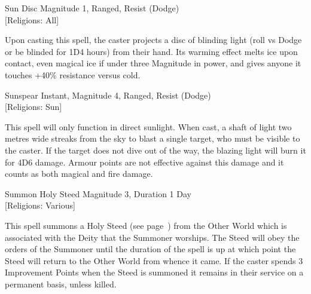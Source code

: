\begin{samepage}
\begin{rpg-spell}
{Sun Disc}
{Magnitude 1, Ranged, Resist (Dodge)\\{[Religions: All]}}

Upon casting this spell, the caster projects a disc of blinding light (roll vs Dodge or be blinded for 1D4 hours) from their hand. Its warming effect melts ice upon contact, even magical ice if under three Magnitude in power, and gives anyone it touches +40\% resistance versus cold.
\end{rpg-spell}
\end{samepage}

\begin{samepage}
\begin{rpg-spell}
{Sunspear}
{Instant, Magnitude 4, Ranged, Resist (Dodge)\\{[Religions: Sun]}}

This spell will only function in direct sunlight. When cast, a shaft of light two metres wide streaks from the sky to blast a single target, who must be visible to the caster. If the target does not dive out of the way, the blazing light will burn it for 4D6 damage. Armour points are not effective against this damage and it counts as both magical and fire damage. 
\end{rpg-spell}
\end{samepage}

\begin{samepage}
\begin{rpg-spell}
{Summon Holy Steed}
{Magnitude 3, Duration 1 Day\\{[Religions: Various]}}

This spell summons a Holy Steed (see page~\pageref{monster:holy-steed}) from the Other World which is associated with the Deity that the Summoner worships. The Steed will obey the orders of the Summoner until the duration of the spell is up at which point the Steed will return to the Other World from whence it came. If the caster spends 3 Improvement Points when the Steed is summoned it remains in their service on a permanent basis, unless killed.
\end{rpg-spell}
\end{samepage}

